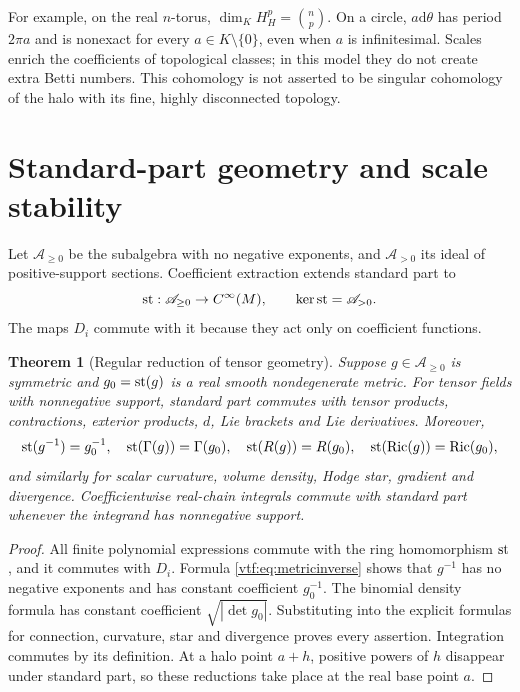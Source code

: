 \documentclass[11pt,letterpaper]{article}
\newtheorem{theorem}{Theorem}[section]
\theoremstyle{definition}
\theoremstyle{remark}
\newcommand{\A}{\mathscr A}\newcommand{\OO}{\mathcal O}\newcommand{\mm}{\mathfrak m}
\newcommand{\Ric}{\operatorname{Ric}}\newcommand{\Scal}{\operatorname{Scal}}
\newcommand{\dd}{\mathrm d}
\begin{document}
For example, on the real $n$-torus,
$\dim_K H_H^p=\binom np$. On a circle, $a\dd\theta$ has period $2\pi a$
and is nonexact for every $a\in K\setminus\{0\}$, even when $a$ is
infinitesimal. Scales enrich the coefficients of topological classes; in this
model they do not create extra Betti numbers. This cohomology is not asserted
to be singular cohomology of the halo with its fine, highly disconnected
topology.

\section{Standard-part geometry and scale stability}\label{vtf:sec:reduction}

Let $\A_{\ge0}$ be the subalgebra with no negative exponents, and
$\A_{>0}$ its ideal of positive-support sections. Coefficient extraction
extends standard part to
\[
 \st:\A_{\ge0}\to C^\infty(M),\qquad
 \ker\st=\A_{>0}.
\]
The maps $D_i$ commute with it because they act only on coefficient functions.

\begin{theorem}[Regular reduction of tensor geometry]\label{vtf:thm:reduction}
Suppose $g\in\A_{\ge0}$ is symmetric and $g_0=\operatorname{st}(g)$ is a real smooth
nondegenerate metric. For tensor fields with nonnegative support,
standard part commutes with tensor products, contractions, exterior
products, $d$, Lie brackets and Lie derivatives. Moreover,
\[
 \st(g^{-1})=g_0^{-1},\quad
 \st(\Gamma(g))=\Gamma(g_0),\quad
 \st(R(g))=R(g_0),\quad
 \st(\Ric(g))=\Ric(g_0),
\]
and similarly for scalar curvature, volume density, Hodge star,
gradient and divergence. Coefficientwise real-chain integrals commute with
standard part whenever the integrand has nonnegative support.
\end{theorem}
\begin{proof}
All finite polynomial expressions commute with the ring homomorphism $\operatorname{st}$,
and it commutes with $D_i$. Formula \eqref{vtf:eq:metricinverse} shows that
$g^{-1}$ has no negative exponents and has constant coefficient $g_0^{-1}$.
The binomial density formula has constant coefficient
$\sqrt{|\det g_0|}$. Substituting into the explicit formulas for connection,
curvature, star and divergence proves every assertion. Integration commutes
by its definition. At a halo point $a+h$, positive powers of $h$ disappear
under standard part, so these reductions take place at the real base point
$a$.
\end{proof}
\end{document}

